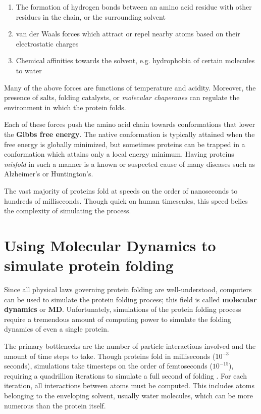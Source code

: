 \documentclass{article}
\begin{document}
\begin{enumerate}
    \item The formation of hydrogen bonds between an amino acid residue with other residues in the chain, or the surrounding solvent
    \item van der Waals forces which attract or repel nearby atoms based on their electrostatic charges
    \item Chemical affinities towards the solvent, e.g. hydrophobia of certain molecules to water
\end{enumerate}

Many of the above forces are functions of temperature and acidity. Moreover, the presence of salts, folding catalysts, or \textit{molecular chaperones} can regulate the environment in which the protein folds.

Each of these forces push the amino acid chain towards conformations that lower the \textbf{Gibbs free energy}. The native conformation is typically attained when the free energy is globally minimized, but sometimes proteins can be trapped in a conformation which attains only a local energy minimum. Having proteins \textit{misfold} in such a manner is a known or suspected cause of many diseases such as Alzheimer's or Huntington's.

The vast majority of proteins fold at speeds on the order of nanoseconds to hundreds of milliseconds. Though quick on human timescales, this speed belies the complexity of simulating the process.

\section{Using Molecular Dynamics to simulate protein folding}
Since all physical laws governing protein folding are well-understood, computers can be used to simulate the protein folding process; this field is called \textbf{molecular dynamics} or \textbf{MD}. Unfortunately, simulations of the protein folding process require a tremendous amount of computing power to simulate the folding dynamics of even a single protein. 

The primary bottlenecks are the number of particle interactions involved and the amount of time steps to take. Though proteins fold in milliseconds ($10^{-3}$ seconds), simulations take timesteps on the order of femtoseconds ($10^{-15}$), requiring a quadrillion iterations to simulate a full second of folding \cite{md}. For each iteration, all interactions between atoms must be computed. This includes atoms belonging to the enveloping solvent, usually water molecules, which can be more numerous than the protein itself.
\end{document}
